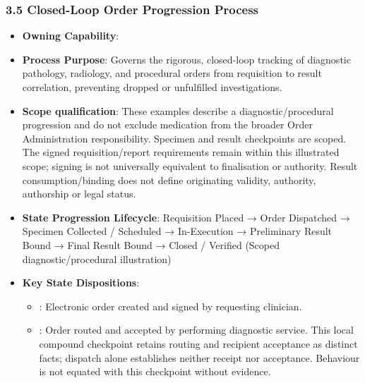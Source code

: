 \par\smallskip
{}\label{rad:processes:135}
\subsubsection*{3.5 Closed-Loop Order Progression Process}
\label{rad:processes:136}

\begin{itemize}

\item
\textbf{Owning Capability}: \texttt{}



\item
\textbf{Process Purpose}: Governs the rigorous, closed-loop tracking of diagnostic pathology, radiology, and procedural orders from requisition to result correlation, preventing dropped or unfulfilled investigations.



\item
\textbf{Scope qualification}: These examples describe a diagnostic/\allowbreak{}procedural progression and do not exclude medication from the broader Order Administration responsibility. Specimen and result checkpoints are scoped. The signed requisition/\allowbreak{}report requirements remain within this illustrated scope; signing is not universally equivalent to finalisation or authority. Result consumption/\allowbreak{}binding does not define originating validity, authority, authorship or legal status.



\item
\textbf{State Progression Lifecycle}: Requisition Placed → Order Dispatched → Specimen Collected /\allowbreak{} Scheduled → In-Execution → Preliminary Result Bound → Final Result Bound → Closed /\allowbreak{} Verified   (Scoped diagnostic/\allowbreak{}procedural illustration)



\item
\textbf{Key State Dispositions}:


\begin{itemize}

\item
\texttt{}: Electronic order created and signed by requesting clinician.



\item
\texttt{}: Order routed and accepted by performing diagnostic service. This local compound checkpoint retains routing and recipient acceptance as distinct facts; dispatch alone establishes neither receipt nor acceptance. Behaviour \texttt{} is not equated with this checkpoint without evidence.




\end{itemize}
\end{itemize}
